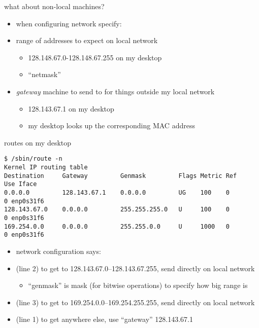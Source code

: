 
\begin{frame}{what about non-local machines?}
    \begin{itemize}
    \item when configuring network specify:
    \vspace{.5cm}
    \item range of addresses to expect on local network 
        \begin{itemize}
        \item 128.148.67.0-128.148.67.255 on my desktop
        \item ``netmask''
        \end{itemize}
    \item \textit{gateway} machine to send to for things outside my local network
        \begin{itemize}
        \item 128.143.67.1 on my desktop
        \item my desktop looks up the corresponding MAC address
        \end{itemize}
    \end{itemize}
\end{frame}

\begin{frame}[fragile]{routes on my desktop}
\begin{Verbatim}[fontsize=\fontsize{9}{10}\selectfont]
$ /sbin/route -n
Kernel IP routing table
Destination     Gateway         Genmask         Flags Metric Ref    Use Iface
0.0.0.0         128.143.67.1    0.0.0.0         UG    100    0        0 enp0s31f6
128.143.67.0    0.0.0.0         255.255.255.0   U     100    0        0 enp0s31f6
169.254.0.0     0.0.0.0         255.255.0.0     U     1000   0        0 enp0s31f6
\end{Verbatim}
\begin{itemize}
\item network configuration says:
\vspace{.5cm}
\item (line 2) to get to 128.143.67.0--128.143.67.255, send directly on local network
    \begin{itemize}
    \item ``genmask'' is mask (for bitwise operations) to specify how big range is
    \end{itemize}
\item (line 3) to get to 169.254.0.0--169.254.255.255, send directly on local network
\item (line 1) to get anywhere else, use ``gateway'' 128.143.67.1
\end{itemize}
\end{frame}
